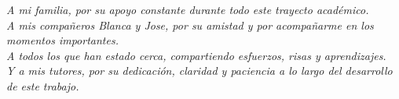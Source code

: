 


\textit{
A mi familia, por su apoyo constante durante todo este trayecto académico. \\
A mis compañeros Blanca y Jose, por su amistad y por acompañarme en los momentos importantes. \\
A todos los que han estado cerca, compartiendo esfuerzos, risas y aprendizajes. \\
Y a mis tutores, por su dedicación, claridad y paciencia a lo largo del desarrollo de este trabajo.
}

\restoregeometry